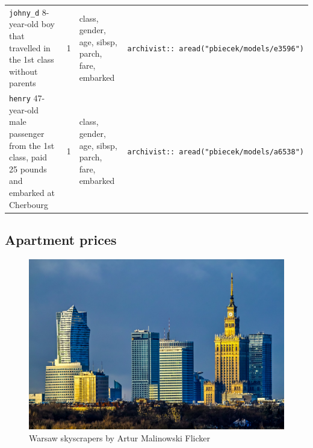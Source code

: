 \documentclass[12pt,]{krantz}
\begin{document}
\begin{longtable}[]{@{}llll@{}}
\begin{minipage}[t]{0.22\columnwidth}
\texttt{johny\_d} 8-year-old boy that travelled in the 1st class without parents\strut
\end{minipage} & \begin{minipage}[t]{0.16\columnwidth}\raggedright
1\strut
\end{minipage} & \begin{minipage}[t]{0.19\columnwidth}\raggedright
class, gender, age, sibsp, parch, fare, embarked\strut
\end{minipage} & \begin{minipage}[t]{0.33\columnwidth}\raggedright
\texttt{archivist::\ aread("pbiecek/models/e3596")}\strut
\end{minipage}\tabularnewline
\begin{minipage}[t]{0.22\columnwidth}\raggedright
\texttt{henry} 47-year-old male passenger from the 1st class, paid 25 pounds and embarked at Cherbourg\strut
\end{minipage} & \begin{minipage}[t]{0.16\columnwidth}\raggedright
1\strut
\end{minipage} & \begin{minipage}[t]{0.19\columnwidth}\raggedright
class, gender, age, sibsp, parch, fare, embarked\strut
\end{minipage} & \begin{minipage}[t]{0.33\columnwidth}\raggedright
\texttt{archivist::\ aread("pbiecek/models/a6538")}\strut
\end{minipage}\tabularnewline
\bottomrule
\end{longtable}

\hypertarget{ApartmentDataset}{%
\subsection{Apartment prices}\label{ApartmentDataset}}

\begin{figure}
\centering
\includegraphics{figure/am1974_flicker.jpg}
\caption{Warsaw skyscrapers by Artur Malinowski Flicker}
\end{figure}
\end{document}

